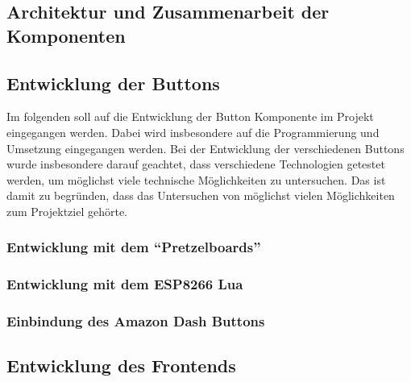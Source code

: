 

\subsection{Architektur und Zusammenarbeit der Komponenten}        
\label{sec:Architektur und Zusammenarbeit der Komponenten-1} 



\newpage

\subsection{Entwicklung der Buttons}  
\label{sec:Entwicklung der Buttons-1} 

Im folgenden soll auf die Entwicklung der Button Komponente im Projekt eingegangen werden. Dabei wird insbesondere auf die Programmierung und Umsetzung eingegangen werden. 
Bei der Entwicklung der verschiedenen Buttons wurde insbesondere darauf geachtet, dass verschiedene Technologien getestet werden, um möglichst viele technische Möglichkeiten zu untersuchen. Das ist damit zu begründen, dass das Untersuchen von möglichst vielen Möglichkeiten zum Projektziel gehörte. 

\subsubsection{Entwicklung mit dem ``Pretzelboards''}  
\label{sec:Entwicklung mit dem ``Pretzelboards''-1}

\subsubsection{Entwicklung mit dem ESP8266 Lua}  
\label{sec:Entwicklung mit dem ESP8266-1}

\subsubsection{Einbindung des Amazon Dash Buttons}  
\label{sec:Einbindung des Amazon Dash Buttons-1}

\newpage

\subsection{Entwicklung des Frontends}  
\label{sec:Entwicklung der Frontends-1} 



